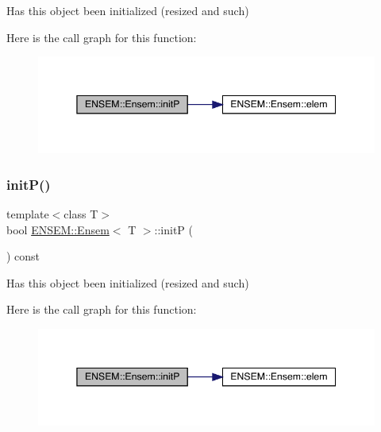 Has this object been initialized (resized and such) 

Here is the call graph for this function\+:
\nopagebreak
\begin{figure}[H]
\begin{center}
\leavevmode
\includegraphics[width=345pt]{d7/d3e/classENSEM_1_1Ensem_af76aaa7b0f354006786dce06dc04669d_cgraph}
\end{center}
\end{figure}
\mbox{\label{classENSEM_1_1Ensem_af76aaa7b0f354006786dce06dc04669d}} 
\subsubsection{\texorpdfstring{initP()}{initP()}\hspace{0.1cm}{\footnotesize\ttfamily [3/3]}}
{\footnotesize\ttfamily template$<$class T$>$ \\
bool \mbox{\hyperlink{classENSEM_1_1Ensem}{E\+N\+S\+E\+M\+::\+Ensem}}$<$ T $>$\+::initP (\begin{DoxyParamCaption}{ }\end{DoxyParamCaption}) const\hspace{0.3cm}{\ttfamily [inline]}}



Has this object been initialized (resized and such) 

Here is the call graph for this function\+:
\nopagebreak
\begin{figure}[H]
\begin{center}
\leavevmode
\includegraphics[width=345pt]{d7/d3e/classENSEM_1_1Ensem_af76aaa7b0f354006786dce06dc04669d_cgraph}
\end{center}
\end{figure}
\mbox{\label{classENSEM_1_1Ensem_a495a563176192200eca2f16978158750}} 
